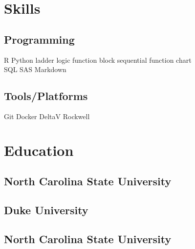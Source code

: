 \documentclass[]{plushcv}
\begin{document}
\begin{minipage}[t]{0.25\textwidth} 


\section{Skills}
\subsection{Programming}
\sectionsep
{}
R \textbullet{} Python \textbullet{} ladder logic \textbullet{} function block \textbullet{} sequential function chart  \\
\sectionsep
{}
SQL \textbullet{} SAS \textbullet{}  Markdown\\
\sectionsep
\sectionsep
\subsection{Tools/Platforms}
\sectionsep
Git \textbullet{} Docker \textbullet{} DeltaV \textbullet{} Rockwell \\

\sectionsep


\section{Education} 
\subsection{North Carolina State University}

\sectionsep
\subsection{Duke University}
\sectionsep

\sectionsep
\subsection{North Carolina State University}
\sectionsep


\end{minipage}
\end{document}
